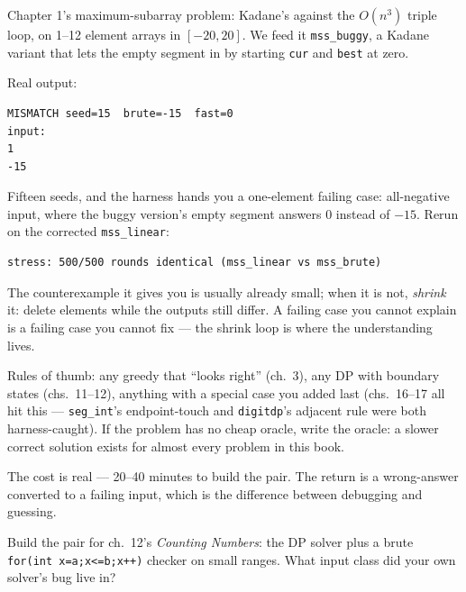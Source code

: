 \begin{example}
Chapter 1's maximum-subarray problem: Kadane's against the
$O(n^3)$ triple loop, on 1--12 element arrays in $[-20,20]$.
We feed it \texttt{mss\_buggy}, a Kadane variant that lets the
empty segment in by starting \texttt{cur} and \texttt{best}
at zero.
\end{example}
\begin{solution}



Real output:
\begin{verbatim}
MISMATCH seed=15  brute=-15  fast=0
input:
1
-15
\end{verbatim}
Fifteen seeds, and the harness hands you a one-element failing
case: all-negative input, where the buggy version's empty
segment answers $0$ instead of $-15$. Rerun on the corrected
\texttt{mss\_linear}:
\begin{verbatim}
stress: 500/500 rounds identical (mss_linear vs mss_brute)
\end{verbatim}
\end{solution}

The counterexample it gives you is usually already small; when
it is not, \emph{shrink} it: delete elements while the outputs
still differ. A failing case you cannot explain is a failing
case you cannot fix --- the shrink loop is where the
understanding lives.

\begin{example}
Rules of thumb: any greedy that ``looks right'' (ch.~3), any
DP with boundary states (chs.~11--12), anything with a
special case you added last (chs.~16--17 all hit this ---
\texttt{seg\_int}'s endpoint-touch and \texttt{digitdp}'s
adjacent rule were both harness-caught). If the problem has
no cheap oracle, write the oracle: a slower correct solution
exists for almost every problem in this book.
\end{example}
\begin{solution}
The cost is real --- 20--40 minutes to build the pair. The
return is a wrong-answer converted to a failing input, which
is the difference between debugging and guessing.
\end{solution}

\begin{exercise}[medium] Build the pair for ch.~12's
\emph{Counting Numbers}: the DP solver plus a brute
\texttt{for(int x=a;x<=b;x++)} checker on small ranges.
What input class did your own solver's bug live in?\end{exercise}

